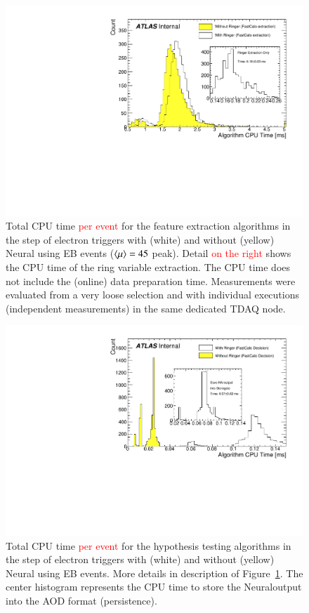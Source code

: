 \begin{figure}[h!tb]
	\includegraphics[width=.7\textwidth]{sections/operation/figures/EgammaFex_TotalTime}
	\centering
	\caption{\label{fig:fastcalo_fex_time}
		Total CPU time \textcolor{red}{per event} for the feature extraction algorithms in
		the \fastcalo step of electron triggers with (white) and without (yellow) Neural\rnn
		using EB events ($\langle \mu \rangle=45$ peak). Detail \textcolor{red}{on the right}
		shows the CPU time of the ring variable extraction. The CPU time does not
		include the (online) data preparation time.  Measurements were evaluated from 
		a very loose selection 
		and with individual executions (independent measurements) in the same dedicated
		TDAQ node.
	}
\end{figure}

\begin{figure}[h!tb]
	\includegraphics[width=.7\textwidth]{sections/operation/figures/EgammaHypo_TotalTime.pdf}
	\centering
	\caption{\label{fig:fastcalo_hypo_time}
		Total CPU time \textcolor{red}{per event} for the hypothesis testing algorithms
		in the \fastcalo step of electron triggers with (white) and without (yellow) Neural\rnn
		using EB events. More details in description of Figure~\ref{fig:fastcalo_fex_time}. 
		The center histogram represents the CPU time to store the Neural\rnn output into the AOD 
		format (persistence).}
\end{figure}


